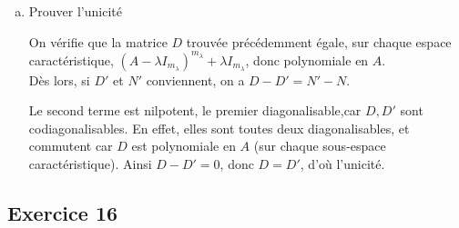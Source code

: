 \documentclass[a4paper, 12pt]{article}
\begin{document}
\begin{enumerate}[a)]
\begin{corr}
			(par lemme des noyaux et théorème de Cayley-Hamilton)
			
			De plus, les $C_\lambda$ sont stables par $A$ (car une matrice polynomiale en $A$ commute avec $A$), donc on peut décomposer $A$ sur chaque $C_\lambda$.
			
			On peut donc décomposer $A$ comme suit:
			$$ A \sim \Diag\left(A_\lambda\right)_{\lambda\in \Sp A}$$
			Où $A_\lambda =  \begin{pmatrix}
				\lambda &  & * \\
				& \ddots &  \\
				(0)&  & \lambda
			\end{pmatrix}$, de degré $m_\lambda$.\\
			
			Or, $A_\lambda = \lambda I_{m_\lambda} + N_\lambda$, avec $N_\lambda$ nilpotente. \\
			
			On a donc $A \sim \Diag (\lambda I_{m_\lambda}) + \Diag(N_\lambda)$.
			
			En notant $D \sim \Diag (\lambda I_{m_\lambda})$, $N \sim \Diag(N_\lambda)$ pour les mêmes matrices de passage, on a bien $D$ diagonalisable, $N$ nilpotente, tq $A = D+N$. \\
			
			De plus, ces deux matrices commutent sur chaque sous-espace caractéristique, donc commutent. On a bien montré l'existence de ces deux matrices.
		\end{corr}
		\item Prouver l'unicité
		\begin{corr}
			On vérifie que la matrice $D$ trouvée précédemment égale, sur chaque espace caractéristique, $(A-\lambda I_{m_\lambda})^{m_\lambda} +  \lambda I_{m_\lambda}$, donc polynomiale en $A$. \\
			
			Dès lors, si $D'$ et $N'$ conviennent, on a $D-D' = N'-N$.
			
			Le second terme est nilpotent, le premier diagonalisable,car $D, D'$ sont codiagonalisables. En effet, elles sont toutes deux diagonalisables, et commutent car $D$ est polynomiale en $A$ (sur chaque sous-espace caractéristique). Ainsi $D-D'=0$, donc $D=D'$, d'où l'unicité.
		\end{corr}
	\end{enumerate}
	
	
	
	\subsection*{Exercice 16}
	
\end{document}
